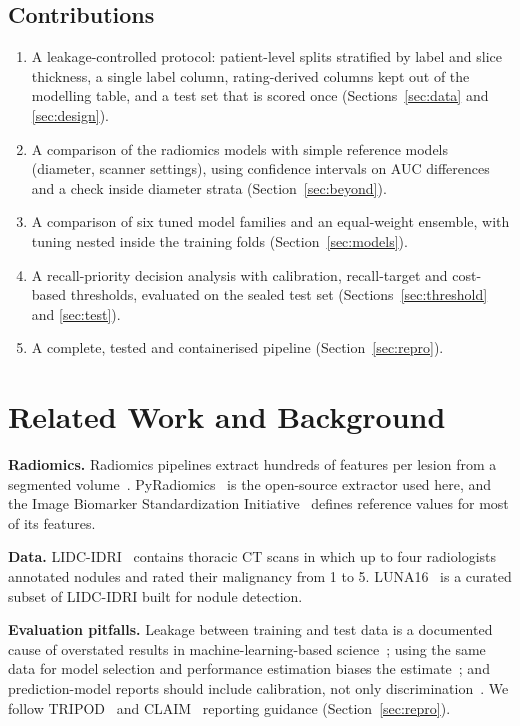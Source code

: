 \documentclass[journal]{IEEEtran}
\begin{document}
\subsection*{Contributions}
\begin{enumerate}
  \item A leakage-controlled protocol: patient-level splits stratified by label and slice thickness,
        a single label column, rating-derived columns kept out of the modelling table, and a test set
        that is scored once (Sections~\ref{sec:data} and \ref{sec:design}).
  \item A comparison of the radiomics models with simple reference models (diameter, scanner settings), using
        confidence intervals on AUC differences and a check inside diameter strata
        (Section~\ref{sec:beyond}).
  \item A comparison of six tuned model families and an equal-weight ensemble, with tuning nested inside
        the training folds (Section~\ref{sec:models}).
  \item A recall-priority decision analysis with calibration, recall-target and cost-based thresholds,
        evaluated on the sealed test set (Sections~\ref{sec:threshold} and \ref{sec:test}).
  \item A complete, tested and containerised pipeline (Section~\ref{sec:repro}).
\end{enumerate}

\section{Related Work and Background}
\label{sec:related}
\textbf{Radiomics.} Radiomics pipelines extract hundreds of features per lesion from a segmented
volume~\cite{lambin2012radiomics,gillies2016radiomics}. PyRadiomics~\cite{vangriethuysen2017pyradiomics}
is the open-source extractor used here, and the Image Biomarker Standardization
Initiative~\cite{zwanenburg2020ibsi} defines reference values for most of its features.

\textbf{Data.} LIDC-IDRI~\cite{armato2011lidc} contains thoracic CT scans in which up to four
radiologists annotated nodules and rated their malignancy from 1 to 5. LUNA16~\cite{setio2017luna16}
is a curated subset of LIDC-IDRI built for nodule detection.

\textbf{Evaluation pitfalls.} Leakage between training and test data is a documented cause of
overstated results in machine-learning-based science~\cite{kapoor2023leakage}; using the same data for
model selection and performance estimation biases the estimate~\cite{cawley2010overfitting,varma2006bias};
and prediction-model reports should include calibration, not only
discrimination~\cite{steyerberg2010assessing}. We follow TRIPOD~\cite{collins2015tripod} and CLAIM~\cite{mongan2020claim}
reporting guidance (Section~\ref{sec:repro}).
\end{document}
